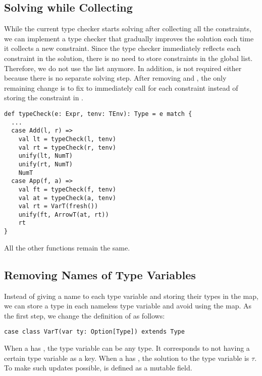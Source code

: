 \subsection{Solving while Collecting}

While the current type checker starts solving after collecting all the
constraints, we can implement a type checker that gradually improves the
solution each time it collects a new constraint. Since the type checker
immediately reflects each constraint in the solution, there is no need to store
constraints in the global list. Therefore, we do not use the 
list anymore. In addition,  is not required either because there is
no separate solving step. After removing  and ,
the only remaining change is to fix  to immediately call
 for each constraint instead of storing the constraint in
.

\begin{verbatim}
def typeCheck(e: Expr, tenv: TEnv): Type = e match {
  ...
  case Add(l, r) =>
    val lt = typeCheck(l, tenv)
    val rt = typeCheck(r, tenv)
    unify(lt, NumT)
    unify(rt, NumT)
    NumT
  case App(f, a) =>
    val ft = typeCheck(f, tenv)
    val at = typeCheck(a, tenv)
    val rt = VarT(fresh())
    unify(ft, ArrowT(at, rt))
    rt
}
\end{verbatim}

All the other functions remain the same.

\subsection{Removing Names of Type Variables}

Instead of giving a name to each type variable and storing their types in the
 map, we can store a type in each nameless type variable and
avoid using the map. As the first step, we change the definition of 
as follows:

\begin{verbatim}
case class VarT(var ty: Option[Type]) extends Type
\end{verbatim}

When a  has , the type variable can be any type. It
corresponds to  not having a certain type variable as a key.
When a  has , the solution to the type variable is
$\tau$. To make such updates possible,  is defined as a mutable field.

